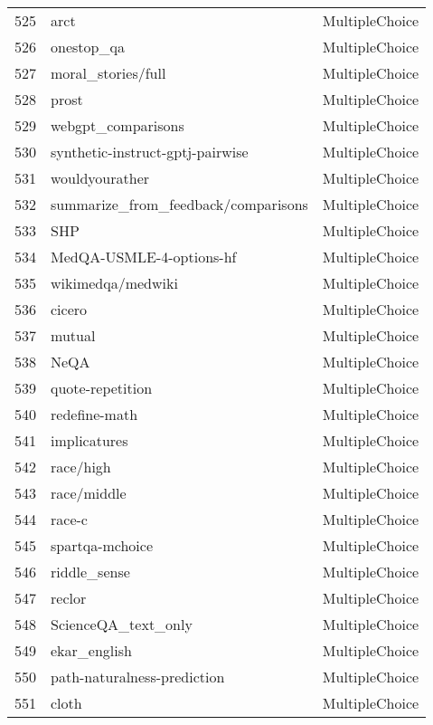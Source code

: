 \documentclass[11pt]{article}
\begin{document}
\begin{longtable}{lll}
525 & arct \citep{Habernal.et.al.2018.NAACL.ARCT} & MultipleChoice \\
526 & onestop\_qa \citep{starc2020} & MultipleChoice \\
527 & moral\_stories/full \citep{Emelin2021MoralSS} & MultipleChoice \\
528 & prost \citep{aroca-ouellette-etal-2021-prost} & MultipleChoice \\
529 & webgpt\_comparisons \citep{nakano2021webgpt} & MultipleChoice \\
530 & synthetic-instruct-gptj-pairwise & MultipleChoice \\
531 & wouldyourather & MultipleChoice \\
532 & summarize\_from\_feedback/comparisons \citep{stienon2020learning} & MultipleChoice \\
533 & SHP \citep{SHP} & MultipleChoice \\
534 & MedQA-USMLE-4-options-hf & MultipleChoice \\
535 & wikimedqa/medwiki \citep{sileo2023generating} & MultipleChoice \\
536 & cicero \citep{ghosal2022cicero} & MultipleChoice \\
537 & mutual \citep{mutual} & MultipleChoice \\
538 & NeQA & MultipleChoice \\
539 & quote-repetition & MultipleChoice \\
540 & redefine-math & MultipleChoice \\
541 & implicatures \citep{george2020conversational} & MultipleChoice \\
542 & race/high \citep{lai2017large} & MultipleChoice \\
543 & race/middle \citep{lai2017large} & MultipleChoice \\
544 & race-c \citep{pmlr-v101-liang19a} & MultipleChoice \\
545 & spartqa-mchoice \citep{mirzaee-etal-2021-spartqa} & MultipleChoice \\
546 & riddle\_sense \citep{lin-etal-2021-riddlesense} & MultipleChoice \\
547 & reclor \citep{yu2020reclor} & MultipleChoice \\
548 & ScienceQA\_text\_only \citep{10.1007/s00799-022-00329-y} & MultipleChoice \\
549 & ekar\_english & MultipleChoice \\
550 & path-naturalness-prediction & MultipleChoice \\
551 & cloth & MultipleChoice \\

\end{longtable}
\end{document}

